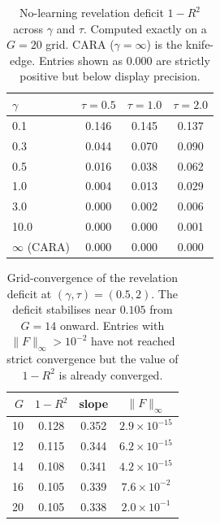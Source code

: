 \documentclass[12pt,letterpaper]{article}
\theoremstyle{definition}
\theoremstyle{remark}
\newcommand{\1}{\mathbf{1}}
\begin{document}
\begin{table}[htbp]
\centering
\caption{No-learning revelation deficit $1-R^{2}$ across $\gamma$ and
$\tau$. Computed exactly on a $G=20$ grid. CARA ($\gamma=\infty$) is the
knife-edge. Entries shown as $0.000$ are strictly positive but below
display precision.}
\label{tab:smooth}
\begin{tabular}{lccc}
   \toprule
   $\gamma$ & $\tau=0.5$ & $\tau=1.0$ & $\tau=2.0$ \\
   \midrule
    0.1   & 0.146 & 0.145 & 0.137 \\
    0.3   & 0.044 & 0.070 & 0.090 \\
    0.5   & 0.016 & 0.038 & 0.062 \\
    1.0   & 0.004 & 0.013 & 0.029 \\
    3.0   & 0.000 & 0.002 & 0.006 \\
   10.0   & 0.000 & 0.000 & 0.001 \\
   $\infty$ (CARA) & 0.000 & 0.000 & 0.000 \\
   \bottomrule
\end{tabular}
\end{table}

\begin{table}[htbp]
\centering
\caption{Grid-convergence of the revelation deficit at $(\gamma,\tau)=(0.5,2)$.
The deficit stabilises near $0.105$ from $G=14$ onward. Entries with
$\|F\|_\infty>10^{-2}$ have not reached strict convergence but the
value of $1-R^{2}$ is already converged.}
\label{tab:G-ladder}
\begin{tabular}{rccc}
\toprule
$G$ & $1-R^{2}$ & slope & $\|F\|_\infty$ \\
\midrule
10 & 0.128 & 0.352 & $2.9\times 10^{-15}$ \\
12 & 0.115 & 0.344 & $6.2\times 10^{-15}$ \\
14 & 0.108 & 0.341 & $4.2\times 10^{-15}$ \\
16 & 0.105 & 0.339 & $7.6\times 10^{-2}$ \\
20 & 0.105 & 0.338 & $2.0\times 10^{-1}$ \\
\bottomrule
\end{tabular}
\end{table}
\end{document}

